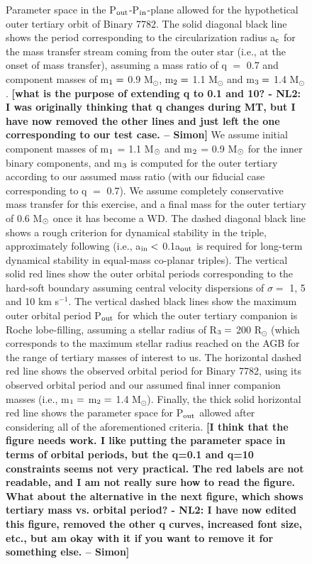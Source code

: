 \documentclass{aastex62}
\def\simon#1{{\bf {\color{red}[#1 -- Simon]}}}
\begin{document}
{\begin{figure}[ht!]
\caption{Parameter space in the P$_{\rm out}$-P$_{\rm in}$-plane
  allowed for the hypothetical outer tertiary orbit of Binary 7782.
  The solid diagonal black line shows the period corresponding to the
  circularization radius a$_{\rm c}$ for the mass transfer stream
  coming from the outer star (i.e., at the onset of mass transfer), assuming a mass ratio of q $=$ 0.7 and component masses 
  of m$_{\rm 1} =$ 0.9 M$_{\odot}$, m$_{\rm 2} =$ 1.1 M$_{\odot}$ and 
  m$_{\rm 3} =$ 1.4 M$_{\odot}$. \simon{what is the purpose of extending q to 0.1 and
    10? - NL2: I was originally thinking that q changes during MT, but I have now removed the other lines and just left the one corresponding to our test case.} We assume initial component masses of m$_{\rm 1}$ = 1.1
  M$_{\rm \odot}$ and m$_{\rm 2}$ = 0.9 M$_{\rm \odot}$ for the inner
  binary components, and m$_{\rm 3}$ is computed for the outer
  tertiary according to our assumed mass ratio (with our fiducial case
  corresponding to q $=$ 0.7).  We assume completely conservative mass
  transfer for this exercise, and a final mass for the outer tertiary
  of 0.6 M$_{\rm \odot}$ once it has become a WD.  The dashed diagonal
  black line shows a rough criterion for dynamical stability in the
  triple, approximately following \citet{mardling99} (i.e., a$_{\rm
    in} <$ 0.1a$_{\rm out}$ is required for long-term dynamical
  stability in equal-mass co-planar triples).  The vertical solid red
  lines show the outer orbital periods corresponding to the hard-soft
  boundary assuming central velocity dispersions of $\sigma =$ 1, 5
  and 10 km s$^{-1}$.  The vertical dashed black lines show the
  maximum outer orbital period P$_{\rm out}$ for which the outer
  tertiary companion is Roche lobe-filling, assuming a stellar radius
  of R$_{\rm 3} =$ 200 R$_{\odot}$ (which corresponds to the maximum stellar radius reached on the AGB for the range of tertiary masses of interest to us.  The horizontal dashed red line shows the observed
  orbital period for Binary 7782, using its observed orbital period
  and our assumed final inner companion masses (i.e., m$_{\rm 1} =$
  m$_{\rm 2} =$ 1.4 M$_{\odot}$).  Finally, the thick solid horizontal
  red line shows the parameter space for P$_{\rm out}$ allowed after
  considering all of the aforementioned criteria.  \simon{I think that
    the figure needs work. I like putting the parameter space in terms
    of orbital periods, but the q=0.1 and q=10 constraints seems
    not very practical. The red labels are not readable, and I am not
    really sure how to read the figure. What about the alternative in
    the next figure, which shows tertiary mass vs. orbital period? - NL2: I have now edited this figure, removed the other q curves, increased font size, etc., but am okay with it if you want to remove it for something else.}
\label{fig:fig2}}
\end{figure}

}
\end{document}
